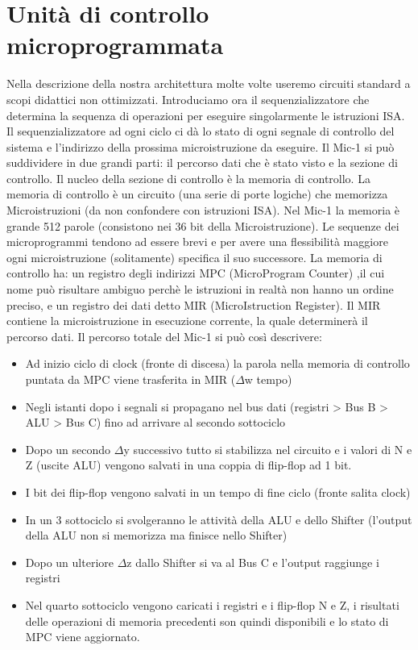 \section{Unità di controllo microprogrammata}
Nella descrizione della nostra architettura molte volte useremo circuiti standard a scopi didattici non ottimizzati. 
Introduciamo ora il sequenzializzatore che determina la sequenza di operazioni per eseguire singolarmente le istruzioni ISA. Il sequenzializzatore ad ogni ciclo ci dà lo stato di ogni segnale di controllo del sistema e l'indirizzo della prossima microistruzione da eseguire. Il Mic-1 si può suddividere in due grandi parti: il percorso dati che è stato visto e la sezione di controllo. Il nucleo della sezione di controllo è la memoria di controllo. La memoria di controllo è un circuito (una serie di porte logiche) che memorizza Microistruzioni (da non confondere con istruzioni ISA). Nel Mic-1 la memoria è grande 512 parole (consistono nei 36 bit della Microistruzione).
Le sequenze dei microprogrammi tendono ad essere brevi e per avere una flessibilità maggiore ogni microistruzione (solitamente) specifica il suo successore.
La memoria di controllo ha: un registro degli indirizzi MPC (MicroProgram Counter) ,il cui nome può risultare ambiguo perchè le istruzioni in realtà non hanno un ordine preciso, e un registro dei dati detto MIR (MicroIstruction Register). Il MIR contiene la microistruzione in esecuzione corrente, la quale determinerà il percorso dati.
Il percorso totale del Mic-1 si può così descrivere:
\begin{itemize}
\item Ad inizio ciclo di clock (fronte di discesa) la parola nella memoria di controllo puntata da MPC viene trasferita in MIR ($\Delta$w tempo)
\item Negli istanti dopo i segnali si propagano nel bus dati (registri > Bus B > ALU > Bus C) fino ad arrivare al secondo sottociclo
\item Dopo un secondo $\Delta$y successivo tutto si stabilizza nel circuito e i valori di N e Z (uscite ALU) vengono salvati in una coppia di flip-flop ad 1 bit.
\item I bit dei flip-flop vengono salvati in un tempo di fine ciclo (fronte salita clock)
\item In un 3 sottociclo si svolgeranno le attività della ALU e dello Shifter (l'output della ALU non si memorizza ma finisce nello Shifter)
\item Dopo un ulteriore $\Delta$z dallo Shifter si va al Bus C e l'output raggiunge i registri
\item Nel quarto sottociclo vengono caricati i registri e i flip-flop N e Z, i risultati delle operazioni di memoria precedenti son quindi disponibili e lo stato di MPC viene aggiornato.
\end{itemize}















